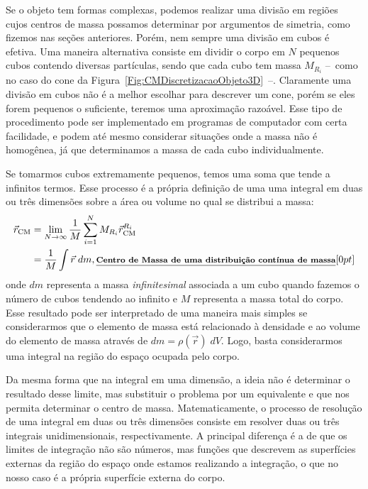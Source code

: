 Se o objeto tem formas complexas, podemos realizar uma divisão em regiões cujos centros de massa possamos determinar por argumentos de simetria, como fizemos nas seções anteriores. Porém, nem sempre uma divisão em cubos é efetiva. Uma maneira alternativa consiste em dividir o corpo em $N$ pequenos cubos contendo diversas partículas, sendo que cada cubo tem massa $M_{R_i}$ --~como no caso do cone da Figura~\ref{Fig:CMDiscretizacaoObjeto3D}~--. Claramente uma divisão em cubos não é a melhor escolhar para descrever um cone, porém se eles forem pequenos o suficiente, teremos uma aproximação razoável. Esse tipo de procedimento pode ser implementado em programas de computador com certa facilidade, e podem até mesmo considerar situações onde a massa não é homogênea, já que determinamos a massa de cada cubo individualmente.

Se tomarmos cubos extremamente pequenos, temos uma soma que tende a infinitos termos. Esse processo é a própria definição de uma uma integral em duas ou três dimensões sobre a área ou volume no qual se distribui a massa:
\begin{align}\label{Eq:CMDistContinua}
  \vec{r}_{\textrm{CM}} &= \lim_{N \to \infty} \frac{1}{M} \sum_{i = 1}^N M_{R_i} \vec{r}_{\rm{CM}}^{R_i} \\
  &= \frac{1}{M} \int \vec{r} \; dm, \relax{\footnotesize\emph{\textbf{Centro de Massa de uma distribuição contínua de massa}}}[0pt]
\end{align}
%
onde $dm$ representa a massa \emph{infinitesimal} associada a um cubo quando fazemos o número de cubos tendendo ao infinito e $M$ representa a massa total do corpo. Esse resultado pode ser interpretado de uma maneira mais simples se considerarmos que o elemento de massa está relacionado à densidade e ao volume do elemento de massa através de $dm = \rho(\vec{r}) \; dV$. Logo, basta considerarmos uma integral na região do espaço ocupada pelo corpo.

Da mesma forma que na integral em uma dimensão, a ideia não é determinar o resultado desse limite, mas substituir o problema por um equivalente e que nos permita determinar o centro de massa. Matematicamente, o processo de resolução de uma integral em duas ou três dimensões consiste em resolver duas ou três integrais unidimensionais, respectivamente. A principal diferença é a de que os limites de integração não são números, mas funções que descrevem as superfícies externas da região do espaço onde estamos realizando a integração, o que no nosso caso é a própria superfície externa do corpo.


